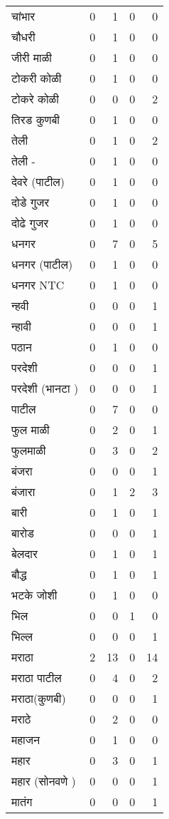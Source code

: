 \documentclass{article}
\begin{document}
\begin{table}
\begin{tabular}{lrrrr}
चांभार & 0 & 1 & 0 & 0 \\
चौधरी & 0 & 1 & 0 & 0 \\
जीरी माळी & 0 & 1 & 0 & 0 \\
टोकरी कोळी & 0 & 1 & 0 & 0 \\
टोकरे कोळी & 0 & 0 & 0 & 2 \\
तिरड कुणबी & 0 & 1 & 0 & 0 \\
तेली & 0 & 1 & 0 & 2 \\
तेली - & 0 & 1 & 0 & 0 \\
देवरे (पाटील) & 0 & 1 & 0 & 0 \\
दोडे गुजर & 0 & 1 & 0 & 0 \\
दोढे गुजर & 0 & 1 & 0 & 0 \\
धनगर & 0 & 7 & 0 & 5 \\
धनगर (पाटील) & 0 & 1 & 0 & 0 \\
धनगर NTC & 0 & 1 & 0 & 0 \\
न्हवी & 0 & 0 & 0 & 1 \\
न्हावी & 0 & 0 & 0 & 1 \\
पठान & 0 & 1 & 0 & 0 \\
परदेशी & 0 & 0 & 0 & 1 \\
परदेशी (भानटा ) & 0 & 0 & 0 & 1 \\
पाटील & 0 & 7 & 0 & 0 \\
फुल माळी & 0 & 2 & 0 & 1 \\
फुलमाळी & 0 & 3 & 0 & 2 \\
बंजरा & 0 & 0 & 0 & 1 \\
बंजारा & 0 & 1 & 2 & 3 \\
बारी & 0 & 1 & 0 & 1 \\
बारोड & 0 & 0 & 0 & 1 \\
बेलदार & 0 & 1 & 0 & 1 \\
बौद्ध & 0 & 1 & 0 & 1 \\
भटके जोशी & 0 & 1 & 0 & 0 \\
भिल & 0 & 0 & 1 & 0 \\
भिल्ल & 0 & 0 & 0 & 1 \\
मराठा & 2 & 13 & 0 & 14 \\
मराठा पाटील & 0 & 4 & 0 & 2 \\
मराठा(कुणबी) & 0 & 0 & 0 & 1 \\
मराठे & 0 & 2 & 0 & 0 \\
महाजन & 0 & 1 & 0 & 0 \\
महार & 0 & 3 & 0 & 1 \\
महार (सोनवणे ) & 0 & 0 & 0 & 1 \\
मातंग & 0 & 0 & 0 & 1 \\

\end{tabular}
\end{table}
\end{document}

